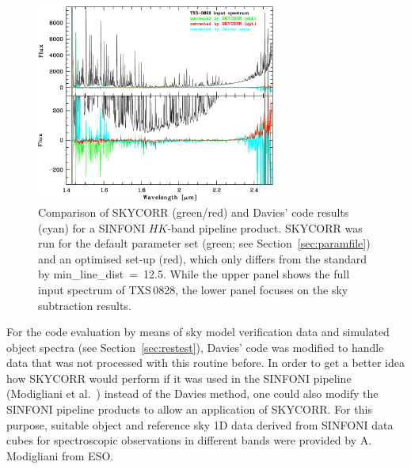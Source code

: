 \begin{figure}
\centering
\includegraphics[width=0.7\textwidth,clip=true]
{figures/scr_comp_sinfo_HK_ex1.pdf}
\caption[]{Comparison of SKYCORR (green/red) and Davies' code results (cyan)
for a SINFONI $HK$-band pipeline product. SKYCORR was run for the default
parameter set (green; see Section~\ref{sec:paramfile}) and an optimised
set-up (red), which only differs from the standard by
{\sc min\_line\_dist}~=~12.5. While the upper panel shows the full input
spectrum of TXS\,0828, the lower panel focuses on the sky subtraction results.}
\label{fig:sinfo_HK_ex1}
\end{figure}

For the code evaluation by means of sky model verification data and simulated
object spectra (see Section~\ref{sec:restest}), Davies' code was modified to
handle data that was not processed with this routine before. In order to get a
better idea how SKYCORR would perform if it was used in the SINFONI pipeline
(Modigliani et al.~\cite{MOD07}) instead of the Davies method, one could also
modify the SINFONI pipeline products to allow an application of SKYCORR. For
this purpose, suitable object and reference sky 1D data derived from SINFONI
data cubes for spectroscopic observations in different bands were provided by
A. Modigliani from ESO.

